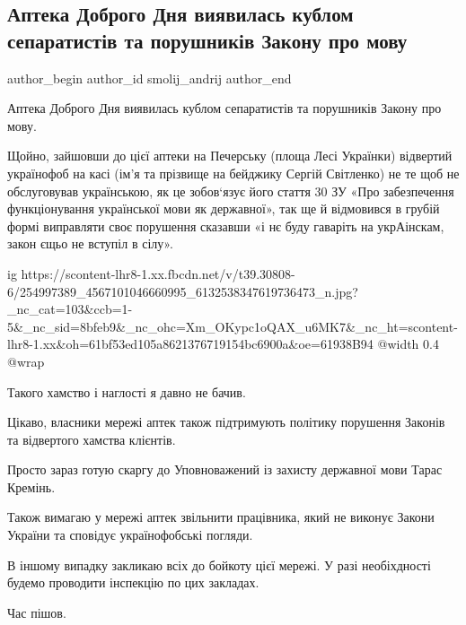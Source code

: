  
 
 
 
 
 
\subsection{Аптека Доброго Дня виявилась кублом сепаратистів та порушників Закону про мову}
\label{sec:11_11_2021.fb.smolij_andrij.1.apteka_dobrogo_dnja_mova}
 
\ifcmt
 author_begin
   author_id smolij_andrij
 author_end
\fi

Аптека Доброго Дня виявилась кублом сепаратистів та порушників Закону про мову. 

Щойно, зайшовши до цієї аптеки на Печерську (площа Лесі Українки) відвертий
українофоб на касі (ім’я та прізвище на бейджику Сергій Світленко) не те щоб не
обслуговував українською, як це зобов‘язує його стаття 30 ЗУ «Про забезпечення
функціонування української мови як державної», так ще й відмовився в грубій
формі виправляти своє порушення сказавши «і нє буду гаваріть на укрАінскам,
закон єщьо не вступіл в сілу».

\ifcmt
  ig https://scontent-lhr8-1.xx.fbcdn.net/v/t39.30808-6/254997389_4567101046660995_6132538347619736473_n.jpg?_nc_cat=103&ccb=1-5&_nc_sid=8bfeb9&_nc_ohc=Xm_OKypc1oQAX_u6MK7&_nc_ht=scontent-lhr8-1.xx&oh=61bf53ed105a8621376719154bc6900a&oe=61938B94
  @width 0.4
  @wrap 
\fi

Такого хамство і наглості я давно не бачив.

Цікаво, власники мережі аптек також підтримують політику порушення Законів та
відвертого хамства клієнтів.

Просто зараз готую скаргу до Уповноважений із захисту державної мови Тарас
Кремінь.

Також вимагаю у мережі аптек звільнити працівника, який не виконує Закони
України та сповідує українофобські погляди.

В іншому випадку закликаю всіх до бойкоту цієї мережі. У разі необіхдності
будемо проводити інспекцію по цих закладах. 

Час пішов.
